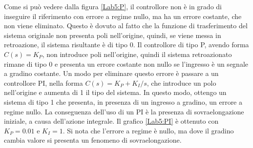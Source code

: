 \documentclass[a4paper, 11pt]{article}
\begin{document}
Come si può vedere dalla figura \ref{Lab5:P}, il controllore non è in grado di inseguire il riferimento con errore a regime nullo, ma ha un errore costante, che non viene eliminato. Questo è dovuto al fatto che la funzione di trasferimento del sistema originale non presenta poli nell'origine, quindi, se viene messa in retroazione, il sistema risultante è di tipo 0. Il controllore di tipo P, avendo forma $C(s) = K_{P}$, non introduce poli nell'origine, quindi il sistema retroazionato rimane di tipo 0 e presenta un errore costante non nullo se l'ingresso è un segnale a gradino costante. Un modo per eliminare questo errore è passare a un controllore PI, nella forma $C(s) = K_{P} + K_{I} / s$, che introduce un polo nell'origine e aumenta di 1 il tipo del sistema. In questo modo, ottengo un sistema di tipo 1 che presenta, in presenza di un ingresso a gradino, un errore a regime nullo. La conseguenza dell'uso di un PI è la presenza di sovraelongazione iniziale, a causa dell'azione integrale. Il grafico \ref{Lab5:PI} è ottenuto con $K_{P} = 0.01$ e $K_{I} = 1$. Si nota che l'errore a regime è nullo, ma dove il gradino cambia valore si presenta un fenomeno di sovraelongazione.
\end{document}
